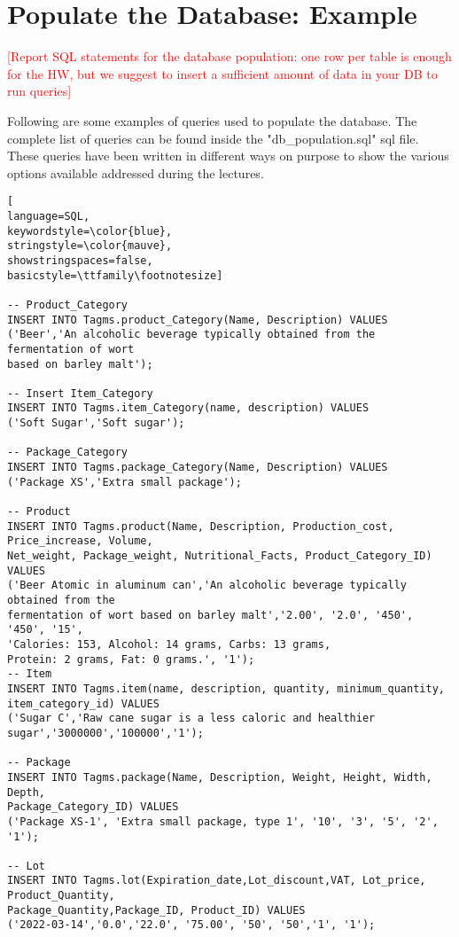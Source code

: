 
\section{Populate the Database: Example}
\textcolor{red}{[Report SQL statements for the database population: one row per table is enough for the HW, but we suggest to insert a sufficient amount of data in your DB to run queries]}

Following are some examples of queries used to populate the database. The complete list of queries can be found inside the "db\_population.sql" sql file. These queries have been written in different ways on purpose to show the various options available addressed during the lectures.


\begin{lstlisting}[
language=SQL,
keywordstyle=\color{blue},
stringstyle=\color{mauve},
showstringspaces=false,
basicstyle=\ttfamily\footnotesize]

-- Product_Category
INSERT INTO Tagms.product_Category(Name, Description) VALUES 
('Beer','An alcoholic beverage typically obtained from the fermentation of wort
based on barley malt');

-- Insert Item_Category
INSERT INTO Tagms.item_Category(name, description) VALUES
('Soft Sugar','Soft sugar');

-- Package_Category
INSERT INTO Tagms.package_Category(Name, Description) VALUES 
('Package XS','Extra small package');

-- Product
INSERT INTO Tagms.product(Name, Description, Production_cost, Price_increase, Volume, 
Net_weight, Package_weight, Nutritional_Facts, Product_Category_ID)  VALUES
('Beer Atomic in aluminum can','An alcoholic beverage typically obtained from the 
fermentation of wort based on barley malt','2.00', '2.0', '450', '450', '15', 
'Calories: 153, Alcohol: 14 grams, Carbs: 13 grams,
Protein: 2 grams, Fat: 0 grams.', '1');
-- Item
INSERT INTO Tagms.item(name, description, quantity, minimum_quantity, item_category_id) VALUES
('Sugar C','Raw cane sugar is a less caloric and healthier sugar','3000000','100000','1');

-- Package
INSERT INTO Tagms.package(Name, Description, Weight, Height, Width, Depth,
Package_Category_ID) VALUES
('Package XS-1', 'Extra small package, type 1', '10', '3', '5', '2', '1');

-- Lot
INSERT INTO Tagms.lot(Expiration_date,Lot_discount,VAT, Lot_price, Product_Quantity,
Package_Quantity,Package_ID, Product_ID) VALUES 
('2022-03-14','0.0','22.0', '75.00', '50', '50','1', '1');


\end{lstlisting}
